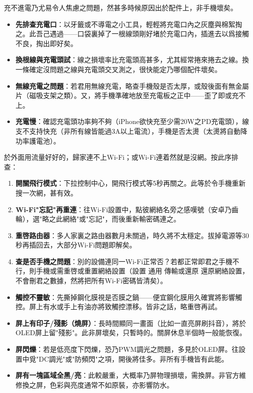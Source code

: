 
充不進電乃尤易令人焦慮之問題，然甚多時候原因出於配件上，非手機壞矣。

\begin{itemize}
  \item \textbf{先排查充電口}：以牙籤或不導電之小工具，輕輕將充電口內之灰塵與棉絮掏之。此吾己遇過——口袋裏掉了一根線頭剛好堵於充電口內，插進去以爲接觸不良，掏出即好矣。
  \item \textbf{換根線與充電頭試}：線之損壞率比充電頭高甚多，尤其經常捲來捲去之線。換一條確定沒問題之線與充電頭交叉測之，很快能定乃哪個配件壞矣。
  \item \textbf{無線充電之問題}：若君用無線充電，略查手機殼是否太厚，或殼後面有無金屬片（磁吸支架之類）。又，將手機準確地放至充電板之正中——歪了即或充不上。
  \item \textbf{充電慢}：確認充電頭功率夠不夠（iPhone欲快充至少需20W之PD充電頭），線支不支持快充（非所有線皆能過3A以上電流），手機是否太燙（太燙將自動降功率護電池）。
\end{itemize}


於外面用流量好好的，歸家連不上Wi-Fi；或Wi-Fi連着然就是沒網。按此序排查：

\begin{enumerate}
  \item \textbf{開關飛行模式}：下拉控制中心，開飛行模式等5秒再關之。此等於令手機重新搜一次網，甚有效。
  \item \textbf{Wi-Fi"忘記"再重連}：往Wi-Fi設置中，點彼網絡名旁之感嘆號（安卓乃齒輪），選"略之此網絡"或"忘記"，而後重新輸密碼連之。
  \item \textbf{重啓路由器}：多人家裏之路由器數月未關過，時久將不太穩定。拔掉電源等30秒再插回去，大部分Wi-Fi問題即解矣。
  \item \textbf{查是否手機之問題}：別的設備連同一Wi-Fi正常否？若都正常即君之手機不行，則手機或需重啓或重置網絡設置（設置 通用 傳輸或還原 還原網絡設置，不會刪君之數據，然將把所有Wi-Fi密碼皆清矣）。
\end{enumerate}


\begin{itemize}
  \item \textbf{觸控不靈敏}：先撕掉鋼化膜視是否膜之鍋——便宜鋼化膜用久確實將影響觸控。屏上有水或手上有油亦將致觸控漂移。皆非之話，略重啓再試。
  \item \textbf{屏上有印子/殘影（燒屏）}：長時間顯同一畫面（比如一直亮屏刷抖音），將於OLED屏上留"殘影"。此非屏壞矣，只暫時的。關屏休息半個時一般能恢復。
  \item \textbf{屏閃爍}：若是低亮度下閃爍，恐乃PWM調光之問題，多見於OLED屏。往設置中覓"DC調光"或"防頻閃"之項，開後將佳多。非所有手機皆有此能。
  \item \textbf{屏有一塊區域全黑/亮}：此較嚴重，大概率乃屏物理損壞，需換屏。非官方維修換之屏，色彩與亮度通常不如原裝，亦影響防水。
\end{itemize}

